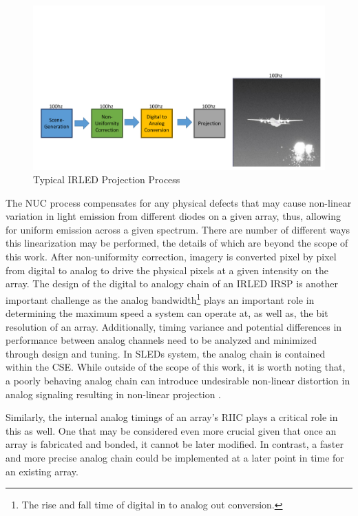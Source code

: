     \begin{figure}
        \centering
        \includegraphics[trim=0in 0.5in 0in 1.5in,width=1.0\textwidth]{fig/typical_projection_system.pdf}
        \caption{Typical IRLED Projection Process}
        \label{fig:typical_projection}
    \end{figure}

    The NUC process compensates for any physical defects that may cause non-linear variation in light emission from different diodes on a given array, thus, allowing for uniform emission across a given spectrum. There are number of different ways this linearization may be performed\cite{BrowningEtAl2016, LandwehrEtAl2017, BarakhshanEtAl2019}, the details of which are beyond the scope of this work. After non-uniformity correction, imagery is converted pixel by pixel from digital to analog to drive the physical pixels at a given intensity on the array. The design of the digital to analogy chain of an IRLED IRSP is another important challenge as the analog bandwidth\footnote{The rise and fall time of digital in to analog out conversion.} plays an important role in determining the maximum speed a system can operate at, as well as, the bit resolution of an array. Additionally, timing variance and potential differences in performance between analog channels need to be analyzed and minimized through design and tuning. In SLEDs system, the analog chain is contained within the CSE. While outside of the scope of this work, it is worth noting that, a poorly behaving analog chain can introduce undesirable non-linear distortion in analog signaling resulting in non-linear projection \cite{freeman1977slewing, gordon1978linear, ChanEtAl2008}.

    Similarly, the internal analog timings of an array's RIIC plays a critical role in this as well. One that may be considered even more crucial given that once an array is fabricated and bonded, it cannot be later modified. In contrast, a faster and more precise analog chain could be implemented at a later point in time for an existing array.


